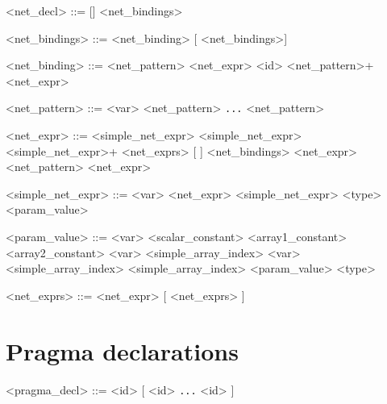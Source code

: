 \begin{grammar}
<net_decl> ::=  [] <net_bindings>

<net_bindings> ::= <net_binding> [ <net_bindings>]

<net_binding> ::= <net_pattern> \lit{=} <net_expr>              %
                \alt <id> <net_pattern>+ \lit{=} <net_expr>    %

<net_pattern> ::= <var>
                \alt \lit{(} <net_pattern> \lit{,} \texttt{...} \lit{,} <net_pattern> \lit{)}
                \alt \lit{()}

             
<net_expr> ::=
   <simple_net_expr>
 \alt <simple_net_expr> <simple_net_expr>+                   %
 \alt <net_exprs>                                            %
 \alt {} [  ] <net_bindings>  <net_expr>         %
 \alt {} <net_pattern> \lit{\texttt{->}} <net_expr>               %

<simple_net_expr> ::=
    <var>                                     %
  \alt \lit{()} 
  \alt \lit{(} <net_expr> \lit{)}
  \alt \lit{(} <simple_net_expr> \lit{:} <type> \lit{)}
  \alt <param_value>

<param_value> ::=
    <var> 
  \alt <scalar_constant>
  \alt <array1_constant>                         
  \alt <array2_constant>                         
  \alt \lit{(} <var> \lit{[} <simple_array_index> \lit{]} \lit{)}
  \alt \lit{(} <var> \lit{[} <simple_array_index> \lit{]} \lit{[} <simple_array_index> \lit{]} \lit{)}
  \alt \lit{(} <param_value> \lit{:} <type> \lit{)}

<net_exprs> ::= <net_expr> [ \lit{,} <net_exprs> ]
\end{grammar}

\section*{Pragma  declarations}

\begin{grammar}
<pragma_decl> ::=  <id> [ \lit{(} <id> \lit{,} \texttt{...} \lit{,} <id> \lit{)} ]
\end{grammar}

